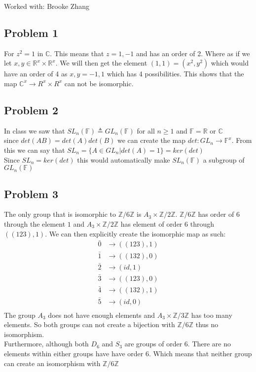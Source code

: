 \documentclass[12pt]{article}
\newcommand{\Z}{\mathbb{Z}}
\newcommand{\R}{\mathbb{R}}
\newcommand{\F}{\mathbb{F}}
\newcommand{\C}{\mathbb{C}}
\begin{document}
Worked with: Brooke Zhang
\subsection*{Problem 1}
For $z^2 = 1$ in $\C$. This means that $z = 1,-1$ and has an order of 2. Where as if we let $x,y \in \R^x \times \R^x$. We will then get the element $(1,1) = (x^2,y^2)$ which would have an order of 4 as $x,y= -1,1$ which has 4 possibilities. This shows that the map $\C^x \rightarrow R^x \times R^x$ can not be isomorphic. 
\subsection*{Problem 2}
In class we saw that $SL_n(\F ) \triangleq GL_n(\F)$ for all $n \geq 1$ and $\F = \R$ or $\C$\\
since $det(AB) = det(A)det(B)$ we can create the map $det: GL_n \rightarrow \F^x$. From this we can say that $SL_n = \{ A \in GL_n | det(A) = 1 \} = ker(det)$\\
Since $SL_n = ker(det)$ this would automatically make $SL_n(\F)$ a subgroup of $GL_n(\F)$ 
\subsection*{Problem 3}
The only group that is isomorphic to $\Z/6\Z$ is $A_3 \times \Z/2\Z$. $\Z/6\Z$ has order of 6 through the element $1$ and $A_3 \times \Z/2\Z$ has element of order 6 through $((123), 1)$. We can then explicitly create the isomorphic map as such:
\begin{align*}
\bar{0} &\rightarrow ((123),1) \\
\bar{1} &\rightarrow ((132),0) \\
\bar{2} &\rightarrow (id,1) \\
\bar{3} &\rightarrow ((123),0) \\
\bar{4} &\rightarrow ((132),1) \\
\bar{5} &\rightarrow (id,0) \\
\end{align*}
The group $A_3$ does not have enough elements and $A_3 \times \Z/3\Z$ has too many elements. So both groups can not create a bijection with $\Z/6\Z$ thus no isomorphism. \\
Furthermore, although both $D_6$ and $S_3$ are groups of order 6. There are no elements within either groups have have order 6. Which means that neither group can create an isomorphism with $\Z/6\Z$
\newpage
\end{document}
